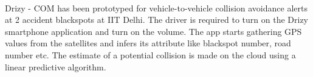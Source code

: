 \paragraph{}Drizy - COM has been prototyped for vehicle-to-vehicle collision avoidance alerts at 2 accident blackspots at IIT Delhi. The driver is required to turn on the Drizy smartphone application and turn on the volume. The app starts gathering GPS values from the satellites and infers its attribute like blackspot number, road number etc. The estimate of a potential collision is made on the cloud using a linear predictive algorithm.
